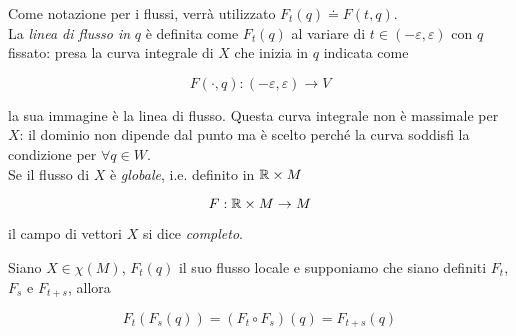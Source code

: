 Come notazione per i flussi, verrà utilizzato $ F_{t}(q) \doteq F(t,q) $.\\
La \textit{linea di flusso in} $ q $ è definita come $ F_{t}(q) $ al variare di $ t \in (-\varepsilon,\varepsilon) $ con $ q $ fissato: presa la curva integrale di $ X $ che inizia in $ q $ indicata come

\begin{equation}
	F(\cdot,q) : (-\varepsilon,\varepsilon) \to V
\end{equation}

la sua immagine è la linea di flusso. Questa curva integrale non è massimale per $ X $: il dominio non dipende dal punto ma è scelto perché la curva soddisfi la condizione per $ \forall q \in W $.\\
Se il flusso di $ X $ è \textit{globale}, i.e. definito in $ \mathbb{R} \times M $

\begin{equation}
	F : \mathbb{R} \times M \to M
\end{equation}

il campo di vettori $ X $ si dice \textit{completo}.

\begin{definition}
	Siano $ X \in \chi(M) $, $ F_{t}(q) $ il suo flusso locale e supponiamo che siano definiti $ F_{t} $, $ F_{s} $ e $ F_{t+s} $, allora
	
	\begin{equation}
		F_{t}(F_{s}(q)) = (F_{t} \circ F_{s})(q) = F_{t+s}(q)
	\end{equation}
\end{definition}

